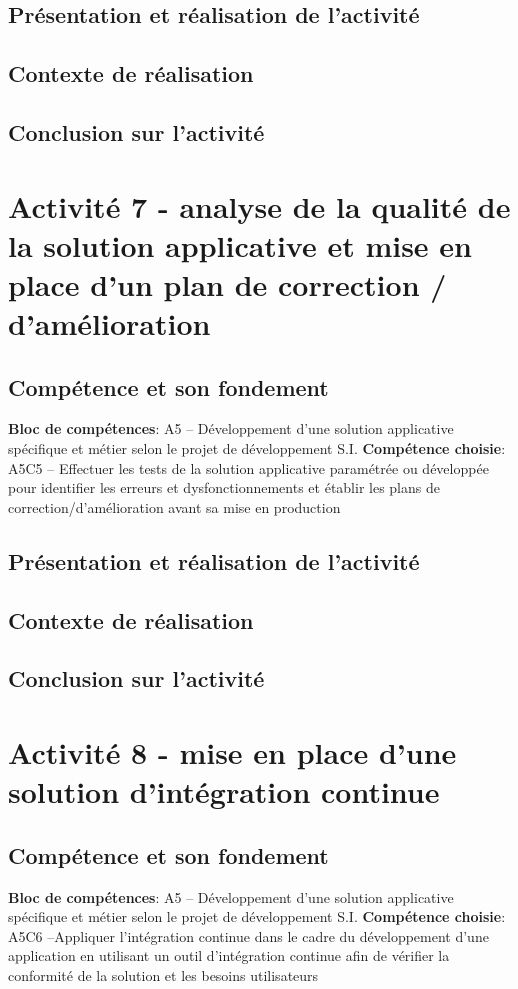 \documentclass[a4paper, 11pt]{report}
\begin{document}
\subsection{Présentation et réalisation de l'activité}
\subsection{Contexte de réalisation}
\subsection{Conclusion sur l'activité}

\section{Activité 7 - analyse de la qualité de la solution applicative et mise en place d’un plan de correction / d’amélioration}
\subsection{Compétence et son fondement}
\textbf{Bloc de compétences}: A5 – Développement d’une solution applicative spécifique et métier selon le projet de développement S.I.
\newline
\textbf{Compétence choisie}: A5C5 – Effectuer les tests de la solution applicative paramétrée ou développée pour identifier les erreurs et dysfonctionnements et établir les plans de correction/d’amélioration avant sa mise en production
\subsection{Présentation et réalisation de l'activité}
\subsection{Contexte de réalisation}
\subsection{Conclusion sur l'activité}

\section{Activité 8 - mise en place d’une solution d’intégration continue}
\subsection{Compétence et son fondement}
\textbf{Bloc de compétences}: A5 – Développement d’une solution applicative spécifique et métier selon le projet de développement S.I.
\newline
\textbf{Compétence choisie}: A5C6 –Appliquer l’intégration continue dans le cadre du développement d’une application en utilisant un outil d’intégration continue afin de vérifier la conformité de la solution et les besoins utilisateurs
\end{document}
